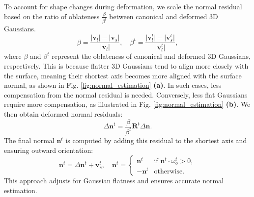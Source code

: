 

\vspace{3pt}  
To account for shape changes during deformation, we scale the normal residual based on the ratio of oblateness $\frac{\beta}{\beta^t}$ between canonical and deformed 3D Gaussians.
\begin{equation}
\beta = \frac{\lvert\mathbf{v}_l\rvert - \lvert\mathbf{v}_s\rvert}{\lvert\mathbf{v}_l\rvert},
\quad
\beta^t = \frac{\lvert\mathbf{v}_l^t\rvert - \lvert\mathbf{v}_s^t\rvert}{\lvert\mathbf{v}_l^t\rvert},
\end{equation}
where $\beta$ and $\beta^t$ represent the oblateness of canonical and deformed 3D Gaussians, respectively. This is because flatter 3D Gaussians tend to align more closely with the surface, meaning their shortest axis becomes more aligned with the surface normal, as shown in Fig. \ref{fig:normal_estimation} \textbf{(a)}. In such cases, less compensation from the normal residual is needed. Conversely, less flat Gaussians require more compensation, as illustrated in Fig. \ref{fig:normal_estimation} \textbf{(b)}. We then obtain deformed normal residuals:
\begin{equation}
\Delta\mathbf{n}^t = \frac{\beta}{\beta^t}\mathbf{R}^t\Delta\mathbf{n}.
\end{equation}
The final normal $\mathbf{n}^t$ is computed by adding this residual to the shortest axis and ensuring outward orientation:
\begin{equation}
\mathbf{n}^t = \Delta\mathbf{n}^t + \mathbf{v}_s^t,
\quad
\mathbf{n}^t =
\begin{cases}
\mathbf{n}^t &  \text{if } \mathbf{n}^t \cdot \omega^t_o > 0, \\
-\mathbf{n}^t & \text{otherwise.}
\end{cases}
\end{equation}
This approach adjusts for Gaussian flatness and ensures accurate normal estimation.


